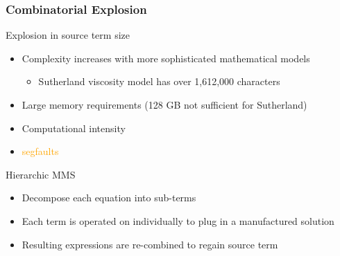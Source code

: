 \documentclass[mathserif]{beamer}
\begin{document}
\begin{frame}
\frametitle{Combinatorial Explosion}

\begin{block}{Explosion in source term size}
  \begin{itemize}
  \item Complexity increases with more sophisticated mathematical models 
    \begin{itemize}
    \item Sutherland viscosity model has over 1,612,000 characters
    \end{itemize}
  \item Large memory requirements (128 GB not sufficient for Sutherland)
  \item Computational intensity
  \item \textcolor{orange}{segfaults}
  \end{itemize}
\end{block}

\begin{block}{Hierarchic MMS}
  \begin{itemize}
  \item Decompose each equation into sub-terms
  \item Each term is operated on individually to plug in a
    manufactured solution
  \item Resulting expressions are re-combined to regain source term
  \end{itemize}
\end{block}

\end{frame}
\end{document}
